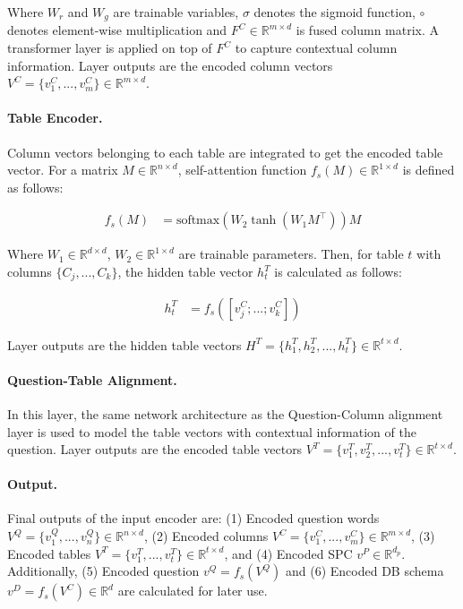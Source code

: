 \documentclass[11pt,a4paper]{article}
\begin{document}
Where $W_r$ and $W_g$ are trainable variables, $\sigma$ denotes the sigmoid function, $\circ$  denotes element-wise multiplication and $F^C \in \mathbb{R}^{m \times d}$ is fused column matrix. A transformer layer \citep{transformer} is applied on top of $F^C$ to capture contextual column information. Layer outputs are the encoded column vectors $V^C=\{v^C_1, ..., v^C_m\} \in \mathbb{R}^{m \times d}$.

\paragraph{Table Encoder.} Column vectors belonging to each table are integrated to get the encoded table vector. For a matrix $M \in \mathbb{R}^{n \times d}$, self-attention function $f_s(M) \in \mathbb{R}^{1 \times d}$ is defined as follows:

\begin{equation}
\begin{aligned}
f_s(M) &= \text{softmax}( W_2 \tanh(W_1M^\intercal) )M
\end{aligned}
\end{equation}

Where $W_1 \in \mathbb{R}^{d \times d}$, $W_2 \in \mathbb{R}^{1 \times d}$ are trainable parameters. Then, for table $t$ with columns $\{C_j, ..., C_k\}$, the hidden table vector $h^T_t$ is calculated as follows:

\begin{align}
h^T_t &= f_s([v^C_j;...;v^C_k])
\end{align}

Layer outputs are the hidden table vectors $H^T=\{h^T_1, h^T_2, ..., h^T_t\} \in \mathbb{R}^{t \times d}$.

\paragraph{Question-Table Alignment.} In this layer, the same network architecture as the Question-Column alignment layer is used to model the table vectors with contextual information of the question. Layer outputs are the encoded table vectors $V^T = \{v^T_1, v^T_2, ..., v^T_t\} \in \mathbb{R} ^ {t \times d}$.

\paragraph{Output.} Final outputs of the input encoder are: (1) Encoded question words $V^Q = \{v^Q_1, ..., v^Q_n\} \in \mathbb{R}^{n \times d}$, (2) Encoded columns $V^C = \{v^C_1, ..., v^C_m\} \in \mathbb{R}^{m \times d}$, (3) Encoded tables $V^T = \{v^T_1, ..., v^T_t\} \in \mathbb{R}^{t \times d}$, and (4) Encoded SPC $v^P \in \mathbb{R}^{d_p}$. Additionally, (5) Encoded question $v^Q = f_s(V^Q)$ and (6) Encoded DB schema $v^D = f_s(V^C) \in \mathbb{R}^d$ are calculated for later use.
\end{document}
